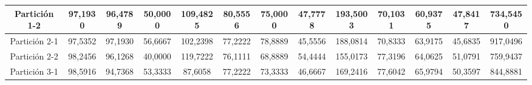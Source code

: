\documentclass[12pt]{article}
\begin{document}
\begin{table}[H]
{\begin{tabular}{|c|cccc|cccc|cccc|}
Partición 1-2 & \multicolumn{1}{c|}{97,1930}                                                  & \multicolumn{1}{c|}{96,4789}                                                 & \multicolumn{1}{c|}{50,0000} & 109,4825 & \multicolumn{1}{c|}{80,5556}                                                  & \multicolumn{1}{c|}{75,0000}                                                 & \multicolumn{1}{c|}{47,7778} & 193,5003 & \multicolumn{1}{c|}{70,1031}                                                  & \multicolumn{1}{c|}{60,9375}                                                 & \multicolumn{1}{c|}{47,8417} & 734,5450 \\ \hline
Partición 2-1 & \multicolumn{1}{c|}{97,5352}                                                  & \multicolumn{1}{c|}{97,1930}                                                 & \multicolumn{1}{c|}{56,6667} & 102,2398 & \multicolumn{1}{c|}{77,2222}                                                  & \multicolumn{1}{c|}{78,8889}                                                 & \multicolumn{1}{c|}{45,5556} & 188,0814 & \multicolumn{1}{c|}{70,8333}                                                  & \multicolumn{1}{c|}{63,9175}                                                 & \multicolumn{1}{c|}{45,6835} & 917,0496 \\ \hline
Partición 2-2 & \multicolumn{1}{c|}{98,2456}                                                  & \multicolumn{1}{c|}{96,1268}                                                 & \multicolumn{1}{c|}{40,0000} & 119,7222 & \multicolumn{1}{c|}{76,1111}                                                  & \multicolumn{1}{c|}{68,8889}                                                 & \multicolumn{1}{c|}{54,4444} & 155,0173 & \multicolumn{1}{c|}{77,3196}                                                  & \multicolumn{1}{c|}{64,0625}                                                 & \multicolumn{1}{c|}{51,0791} & 759,9437 \\ \hline
Partición 3-1 & \multicolumn{1}{c|}{98,5916}                                                  & \multicolumn{1}{c|}{94,7368}                                                 & \multicolumn{1}{c|}{53,3333} & 87,6058  & \multicolumn{1}{c|}{77,2222}                                                  & \multicolumn{1}{c|}{73,3333}                                                 & \multicolumn{1}{c|}{46,6667} & 169,2416 & \multicolumn{1}{c|}{77,6042}                                                  & \multicolumn{1}{c|}{65,9794}                                                 & \multicolumn{1}{c|}{50,3597} & 844,8881 \\ \hline

\end{tabular}}
\end{table}
\end{document}
